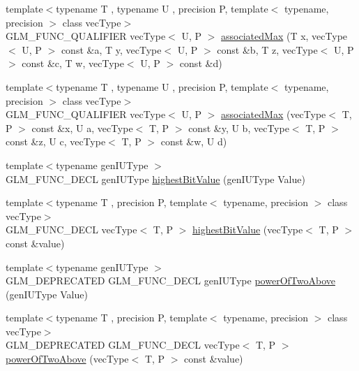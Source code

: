 \begin{DoxyCompactItemize}
\item 
{\footnotesize template$<$typename T , typename U , precision P, template$<$ typename, precision $>$ class vec\+Type$>$ }\\G\+L\+M\+\_\+\+F\+U\+N\+C\+\_\+\+Q\+U\+A\+L\+I\+F\+I\+E\+R vec\+Type$<$ U, P $>$ \hyperlink{group__gtx__associated__min__max_ga7a165de1af9a3f9193516a3b47407086}{associated\+Max} (T x, vec\+Type$<$ U, P $>$ const \&a, T y, vec\+Type$<$ U, P $>$ const \&b, T z, vec\+Type$<$ U, P $>$ const \&c, T w, vec\+Type$<$ U, P $>$ const \&d)
\item 
{\footnotesize template$<$typename T , typename U , precision P, template$<$ typename, precision $>$ class vec\+Type$>$ }\\G\+L\+M\+\_\+\+F\+U\+N\+C\+\_\+\+Q\+U\+A\+L\+I\+F\+I\+E\+R vec\+Type$<$ U, P $>$ \hyperlink{group__gtx__associated__min__max_ga3122fbe8133ea54749b10fb93e8a167e}{associated\+Max} (vec\+Type$<$ T, P $>$ const \&x, U a, vec\+Type$<$ T, P $>$ const \&y, U b, vec\+Type$<$ T, P $>$ const \&z, U c, vec\+Type$<$ T, P $>$ const \&w, U d)
\item 
{\footnotesize template$<$typename gen\+I\+U\+Type $>$ }\\G\+L\+M\+\_\+\+F\+U\+N\+C\+\_\+\+D\+E\+C\+L gen\+I\+U\+Type \hyperlink{group__gtx__bit_ga0dcc8fe7c3d3ad60dea409281efa3d05}{highest\+Bit\+Value} (gen\+I\+U\+Type Value)
\item 
{\footnotesize template$<$typename T , precision P, template$<$ typename, precision $>$ class vec\+Type$>$ }\\G\+L\+M\+\_\+\+F\+U\+N\+C\+\_\+\+D\+E\+C\+L vec\+Type$<$ T, P $>$ \hyperlink{group__gtx__bit_ga5eea3a4d429040af13d39a7d7cd84d73}{highest\+Bit\+Value} (vec\+Type$<$ T, P $>$ const \&value)
\item 
{\footnotesize template$<$typename gen\+I\+U\+Type $>$ }\\G\+L\+M\+\_\+\+D\+E\+P\+R\+E\+C\+A\+T\+E\+D G\+L\+M\+\_\+\+F\+U\+N\+C\+\_\+\+D\+E\+C\+L gen\+I\+U\+Type \hyperlink{group__gtx__bit_ga8cda2459871f574a0aecbe702ac93291}{power\+Of\+Two\+Above} (gen\+I\+U\+Type Value)
\item 
{\footnotesize template$<$typename T , precision P, template$<$ typename, precision $>$ class vec\+Type$>$ }\\G\+L\+M\+\_\+\+D\+E\+P\+R\+E\+C\+A\+T\+E\+D G\+L\+M\+\_\+\+F\+U\+N\+C\+\_\+\+D\+E\+C\+L vec\+Type$<$ T, P $>$ \hyperlink{group__gtx__bit_gafe08808a50226b75b50e640a08b32ddc}{power\+Of\+Two\+Above} (vec\+Type$<$ T, P $>$ const \&value)
\item 

\end{DoxyCompactItemize}

